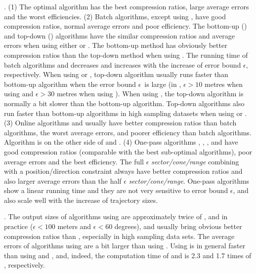 .
(1) The optimal algorithm has the best compression ratios, large average errors and the worst efficiencies.
%
(2) Batch algorithms, except \dpa using \dad, have good compression ratios, normal average errors and poor efficiency.
%
The bottom-up (\tpa) and top-down (\dpa) algorithms have the similar compression ratios and average errors when using either \ped or \sed. The bottom-up method has obviously better compression ratios than the top-down method when using \dad.
%
The running time of batch algorithms \dpa and \tpa decreases and increases with the increase of error bound $\epsilon$, respectively. When using \ped or \sed, top-down algorithm \dpa usually runs faster than bottom-up algorithm \tpa when the error bound $\epsilon$~is large  (\eg in \geolife, $\epsilon >10$ metres when using \ped and $\epsilon >30$ metres when using \sed). When using \dad, the top-down algorithm is normally a bit slower than the bottom-up algorithm.
Top-down algorithms also run faster than bottom-up algorithms in high sampling datasets when using \ped or \sed.
%
(3) Online algorithms \opwa and \bqsa usually have better compression ratios than batch algorithms, the worst average errors, and poorer efficiency than batch algorithms. Algorithm \squishe is on the other side of \opwa and \bqsa.
%
(4) One-pass algorithms \operb, \siped, \cised, \intersec and \interval have good compression ratios (comparable with the best sub-optimal algorithms), poor average errors and the best efficiency.
%
The full $\epsilon$ \emph{sector/cone/range} combining with a position/direction constraint always have better compression ratios and also larger average errors than the half $\epsilon$ \emph{sector/cone/range}. %
%
One-pass algorithms show a linear running time and they are not very sensitive to error bound $\epsilon$, and also scale well with the increase of trajectory sizes.



.
The output sizes of algorithms using \sed are approximately twice of \ped, and in practice (\eg $\epsilon <100$ meters and $\epsilon < 60$ degrees), \ped and \sed usually bring obvious better compression ratios than \dad, especially in high sampling data sets.
%
The average errors of algorithms using \sed are a bit larger than using \ped.
%
Using \dad is in general faster than using \ped and \sed, and, indeed, the computation time of \ped and \sed is 2.3 and 1.7 times of \dad, respectively.



